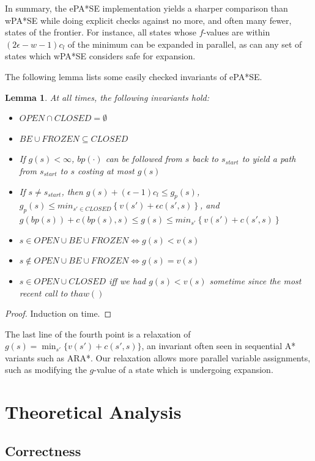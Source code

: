 \documentclass[letterpaper]{article}
\newtheorem{lemma}{Lemma}
\begin{document}
In summary, the ePA*SE implementation yields a sharper comparison than wPA*SE while doing explicit checks against no more, and often many fewer, states of the frontier. For instance, all states whose $f$-values are within $(2\epsilon-w-1)c_l$ of the minimum can be expanded in parallel, as can any set of states which wPA*SE considers safe for expansion.

The following lemma lists some easily checked invariants of ePA*SE.

\begin{lemma}
\label{lem:prop}
At all times, the following invariants hold:
\begin{itemize}
\item $OPEN\cap CLOSED = \emptyset$
\item $BE\cup FROZEN \subseteq CLOSED$
\item If $g(s)<\infty$, $bp(\cdot)$ can be followed from $s$ back to $s_{start}$ to yield a path from $s_{start}$ to $s$ costing at most $g(s)$
\item If $s\ne s_{start}$, then $g(s) + (\epsilon-1)c_l \le g_p(s)$,
\\$g_p(s) \le min_{s'\in CLOSED}\left\{v(s') + \epsilon c(s',s)\right\}$, and
\\$g(bp(s)) + c(bp(s),s) \le g(s) \le min_{s'}\left\{v(s') + c(s',s)\right\}$
\item $s\in OPEN\cup BE\cup FROZEN \Leftrightarrow g(s) < v(s)$
\item $s\notin OPEN\cup BE\cup FROZEN \Leftrightarrow g(s) = v(s)$
\item $s\in OPEN\cup CLOSED$ iff we had $g(s)<v(s)$ sometime since the most recent call to $thaw()$
\end{itemize}
\end{lemma}

\begin{proof}
Induction on time.
\end{proof}

The last line of the fourth point is a relaxation of $g(s) = \min_{s'}\{v(s') + c(s',s)\}$, an invariant often seen in sequential A* variants such as ARA*. Our relaxation allows more parallel variable assignments, such as modifying the $g$-value of a state which is undergoing expansion.

\section{Theoretical Analysis}

\subsection{Correctness}
\end{document}
